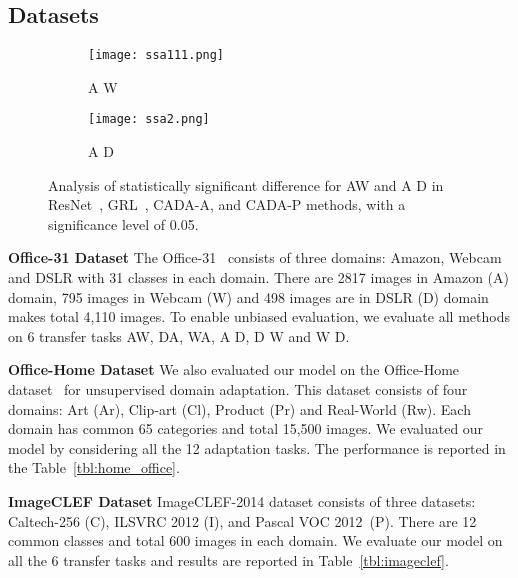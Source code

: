 \documentclass[10pt,twocolumn,letterpaper]{article}
\begin{document}
\subsection{Datasets}

\begin{figure}
\vspace{-0.5em}
\begin{subfigure}{.24\textwidth}
  \centering
  \texttt{[image: ssa111.png]}
  \caption{ A  W }
  \label{fig:sfig10}
\end{subfigure}\begin{subfigure}{.24\textwidth}
  \centering
  \texttt{[image: ssa2.png]}
  \caption{A  D}
  \label{fig:sfig23}
\end{subfigure}
 \caption{Analysis of statistically significant difference for AW  and A D in ResNet~\cite{he2016deep}, GRL~\cite{ganin_ICML2015}, CADA-A, and CADA-P methods, with a significance level of 0.05.}
 \label{fig:ssa1}
 \vspace{-1.5em}
\end{figure}
\textbf{Office-31 Dataset}
The Office-31~\cite{saenko_ECCV2010} consists of three domains: Amazon, Webcam and DSLR with 31 classes in each domain.
There are 2817 images in Amazon (A) domain, 795 images in Webcam (W) and 498 images are in DSLR (D) domain makes total 4,110 images.
To enable unbiased evaluation, we evaluate all methods on 6 transfer tasks AW, DA, WA, A D, D W and W  D.
\vspace{0.8em}

\textbf{Office-Home Dataset}
We also evaluated our model on the Office-Home dataset~\cite{venkateswara_cvpr2017deep} for unsupervised domain adaptation. This dataset consists of four domains: Art (Ar), Clip-art (Cl), Product (Pr) and Real-World (Rw). Each domain has common 65 categories and total 15,500 images. 
We evaluated our model by considering all the 12 adaptation tasks.
The performance is reported in the Table~\ref{tbl:home_office}.
\vspace{0.8em}

\textbf{ImageCLEF Dataset}
ImageCLEF-2014 dataset consists of three datasets: Caltech-256 (C), ILSVRC 2012 (I), and Pascal VOC 2012~(P). There are 12 common classes and total 600 images in each domain. We evaluate our model on all the 6 transfer tasks and results are reported in Table~\ref{tbl:imageclef}.
\end{document}
